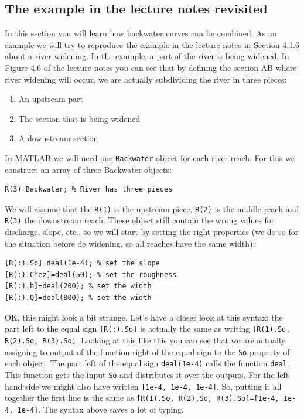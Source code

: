 \documentclass[a4paper]{article}
\begin{document}
\subsection{The example in the lecture notes revisited}
\label{sec:combining_backwaters}
In this section you will learn how backwater curves can be combined. As an example we will try to reproduce the example in the lecture notes in Section 4.1.6 about a river widening. In the example, a part of the river is being widened. In Figure 4.6 of the lecture notes you can see that by defining the section AB where river widening will occur, we are actually subdividing the river in three pieces:
\begin{enumerate}
  \item An upstream part
  \item The section that is being widened
  \item A downstream section
\end{enumerate}
In MATLAB we will need one \lstinline{Backwater} object for each river reach.
For this we construct an array of three Backwater objects:
\begin{lstlisting}
R(3)=Backwater; % River has three pieces
\end{lstlisting}
We will assume that the \lstinline{R(1)} is the upstream piece, \lstinline{R(2)} is the middle reach and \lstinline{R(3)} the downstream reach.
These object still contain the wrong values for discharge, slope, etc., so we will start by setting the right properties (we do so for the situation before de widening, so all reaches have the same width):
\begin{lstlisting}
[R(:).So]=deal(1e-4); % set the slope
[R(:).Chez]=deal(50); % set the roughness
[R(:).b]=deal(200); % set the width
[R(:).Q]=deal(800); % set the width
\end{lstlisting}
OK, this might look a bit strange. Let's have a closer look at this syntax: the part left to the equal sign \lstinline{[R(:).So]} is actually the same as writing \lstinline{[R(1).So, R(2).So, R(3).So]}. Looking at this like this you can see that we are actually assigning to output of the function right of the equal sign to the \lstinline{So} property of each object. The part left of the equal sign \lstinline{deal(1e-4)} calls the function \lstinline{deal}. This function gets the input \lstinline{So} and distributes it over the outputs. For the left hand side we might also have written \lstinline{[1e-4, 1e-4, 1e-4]}. So, putting it all together the first line is the same as \lstinline{[R(1).So, R(2).So, R(3).So]=[1e-4, 1e-4, 1e-4]}. The syntax above saves a lot of typing.
\end{document}
